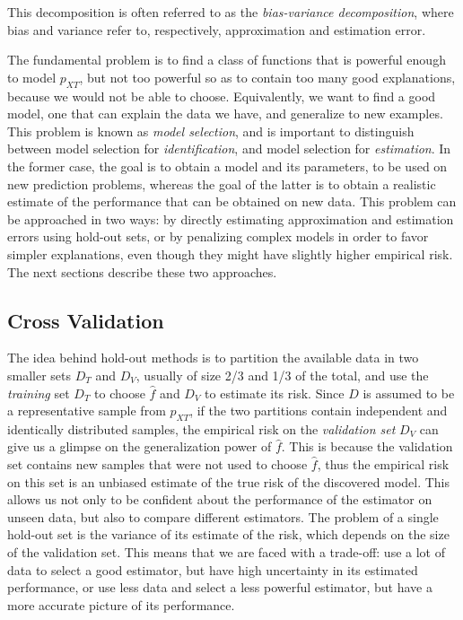 \documentclass[12pt]{book}
\begin{document}
This decomposition is often referred to as the \emph{bias-variance decomposition}, where bias and variance refer to, respectively, approximation and estimation error.

The fundamental problem is to find a class of functions that is powerful enough to model $p_{XT}$, but not too powerful so as to contain too many good explanations, because we would not be able to choose. Equivalently, we want to find a good model, one that can explain the data we have, and generalize to new examples. This problem is known as \emph{model selection}, and is important to distinguish between model selection for \emph{identification}, and model selection for \emph{estimation}. In the former case, the goal is to obtain a model and its parameters, to be used on new prediction problems, whereas the goal of the latter is to obtain a realistic estimate of the performance that can be obtained on new data. This problem can be approached in two ways: by directly estimating approximation and estimation errors using hold-out sets, or by penalizing complex models in order to favor simpler explanations, even though they might have slightly higher empirical risk. The next sections describe these two approaches.


\subsection{Cross Validation}
\label{sec:cv}
The idea behind hold-out methods is to partition the available data in two smaller sets $D_T$ and $D_V$, usually of size 2/3 and 1/3 of the total, and use the \emph{training} set $D_T$ to choose $\hat{f}$ and $D_V$ to estimate its risk. Since $D$ is assumed to be a representative sample from $p_{XT}$, if the two partitions contain independent and identically distributed samples, the empirical risk on the \emph{validation set} $D_V$ can give us a glimpse on the generalization power of $\hat{f}$. This is because the validation set contains new samples that were not used to choose $\hat{f}$, thus the empirical risk on this set is an unbiased estimate of the true risk of the discovered model. This allows us not only to be confident about the performance of the estimator on unseen data, but also to compare different estimators. The problem of a single hold-out set is the variance of its estimate of the risk, which depends on the size of the validation set. This means that we are faced with a trade-off: use a lot of data to select a good estimator, but have high uncertainty in its estimated performance, or use less data and select a less powerful estimator, but have a more accurate picture of its performance.
\end{document}
